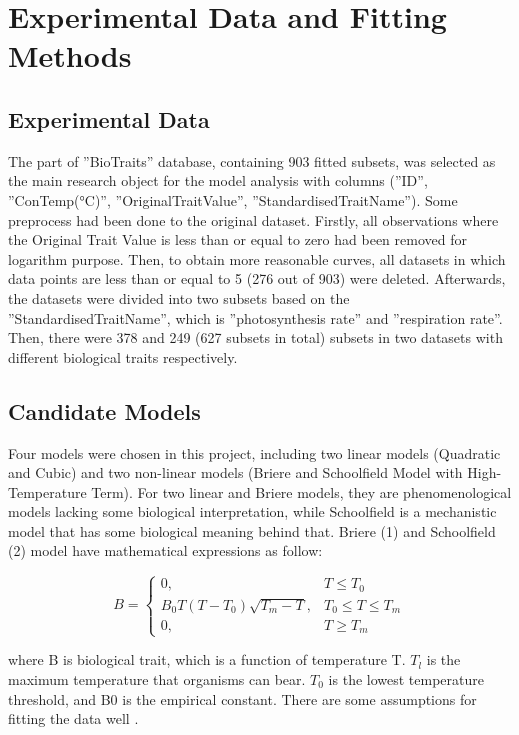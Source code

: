 \section{Experimental Data and Fitting Methods}

\subsection{Experimental Data}

The part of ”BioTraits” database, containing 903 ﬁtted subsets, was selected as the main research object for the model analysis with columns (”ID”, ”ConTemp(°C)”, ”OriginalTraitValue”, ”StandardisedTraitName”). Some preprocess had been done to the original dataset. Firstly, all observations where the Original Trait Value is less than or equal to zero had been removed for logarithm purpose. Then, to obtain more reasonable curves, all datasets in which data points are less than or equal to 5 (276 out of 903) were deleted. Afterwards, the datasets were divided into two subsets based on the ”StandardisedTraitName”, which is ”photosynthesis rate” and ”respiration rate”. Then, there were 378 and 249 (627 subsets in total) subsets in two datasets with different biological traits respectively.

\subsection{Candidate Models}

Four models were chosen in this project, including two linear models (Quadratic and Cubic) and two non-linear models (Briere and Schoolﬁeld Model with High-Temperature Term). For two linear and Briere models, they are phenomenological models lacking some biological interpretation, while Schoolﬁeld is a mechanistic model that has some biological meaning behind that. Briere (1) and Schoolﬁeld (2) model have mathematical expressions as follow:

\begin{equation}
    B =
    \begin{cases}
    0,                           &\text{$T \leq T_0$} \\
    B_0T(T-T_0) \sqrt {T_m - T}, &\text{$T_0 \leq T \leq T_m$} \\
    0,                           &\text{$T \geq T_m$}
    \end{cases}
\end{equation}

where B is biological trait, which is a function of temperature T. $T_l$ is the maximum temperature that organisms can bear.
$T_0$ is the lowest temperature threshold, and B0 is the empirical constant. There are some assumptions for fitting the data well \cite{briere_pracros_1999}.

